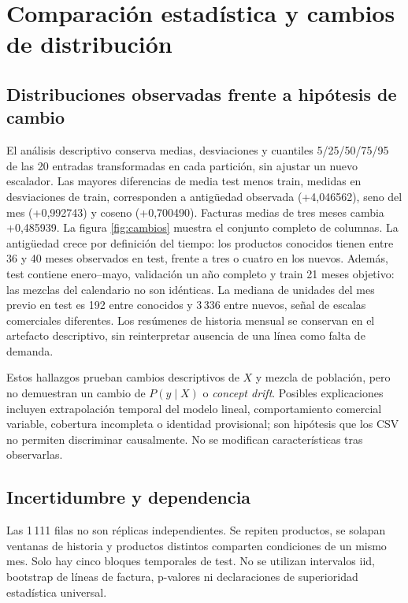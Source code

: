 \barrerapagina
\section{Comparación estadística y cambios de distribución}
\subsection{Distribuciones observadas frente a hipótesis de cambio}
El análisis descriptivo conserva medias, desviaciones y cuantiles 5/25/50/75/95 de las 20 entradas transformadas en cada partición, sin ajustar un nuevo escalador. Las mayores diferencias de media test menos train, medidas en desviaciones de train, corresponden a antigüedad observada (+4,046562), seno del mes (+0,992743) y coseno (+0,700490). Facturas medias de tres meses cambia +0,485939. La figura \ref{fig:cambios} muestra el conjunto completo de columnas.
La antigüedad crece por definición del tiempo: los productos conocidos tienen entre 36 y 40 meses observados en test, frente a tres o cuatro en los nuevos. Además, test contiene enero--mayo, validación un año completo y train 21 meses objetivo: las mezclas del calendario no son idénticas. La mediana de unidades del mes previo en test es 192 entre conocidos y 3\,336 entre nuevos, señal de escalas comerciales diferentes. Los resúmenes de historia mensual se conservan en el artefacto descriptivo, sin reinterpretar ausencia de una línea como falta de demanda.

Estos hallazgos prueban cambios descriptivos de $X$ y mezcla de población, pero no demuestran un cambio de $P(y\mid X)$ o \emph{concept drift}. Posibles explicaciones incluyen extrapolación temporal del modelo lineal, comportamiento comercial variable, cobertura incompleta o identidad provisional; son hipótesis que los CSV no permiten discriminar causalmente. No se modifican características tras observarlas.

\subsection{Incertidumbre y dependencia}
Las 1\,111 filas no son réplicas independientes. Se repiten productos, se solapan ventanas de historia y productos distintos comparten condiciones de un mismo mes. Solo hay cinco bloques temporales de test. No se utilizan intervalos iid, bootstrap de líneas de factura, p-valores ni declaraciones de superioridad estadística universal.

